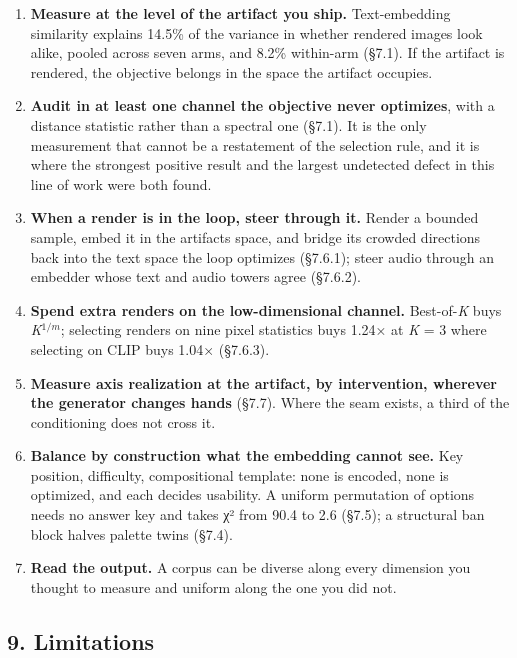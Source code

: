 \documentclass[
  10pt,
]{article}
\theoremstyle{plain}
\theoremstyle{definition}
\begin{document}
\begin{enumerate}
  every distance statistic a statistic about duplication.
\item
  \textbf{Measure at the level of the artifact you ship.} Text-embedding
  similarity explains 14.5\% of the variance in whether rendered images
  look alike, pooled across seven arms, and 8.2\% within-arm (§7.1). If
  the artifact is rendered, the objective belongs in the space the
  artifact occupies.
\item
  \textbf{Audit in at least one channel the objective never optimizes},
  with a distance statistic rather than a spectral one (§7.1). It is the
  only measurement that cannot be a restatement of the selection rule,
  and it is where the strongest positive result and the largest
  undetected defect in this line of work were both found.
\item
  \textbf{When a render is in the loop, steer through it.} Render a
  bounded sample, embed it in the artifact\textquotesingle s space, and
  bridge its crowded directions back into the text space the loop
  optimizes (§7.6.1); steer audio through an embedder whose text and
  audio towers agree (§7.6.2).
\item
  \textbf{Spend extra renders on the low-dimensional channel.}
  Best-of-\emph{K} buys \emph{K}\(^{1/m}\); selecting renders on nine
  pixel statistics buys 1.24× at \emph{K} = 3 where selecting on CLIP
  buys 1.04× (§7.6.3).
\item
  \textbf{Measure axis realization at the artifact, by intervention,
  wherever the generator changes hands} (§7.7). Where the seam exists, a
  third of the conditioning does not cross it.
\item
  \textbf{Balance by construction what the embedding cannot see.} Key
  position, difficulty, compositional template: none is encoded, none is
  optimized, and each decides usability. A uniform permutation of
  options needs no answer key and takes χ² from 90.4 to 2.6 (§7.5); a
  structural ban block halves palette twins (§7.4).
\item
  \textbf{Read the output.} A corpus can be diverse along every
  dimension you thought to measure and uniform along the one you did
  not.
\end{enumerate}

\subsection{9. Limitations}\label{9-limitations}
\end{document}
